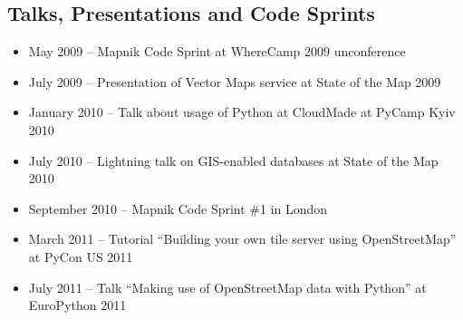 \documentclass[margin]{res}
\begin{document}
\begin{resume}
\section{Talks, Presentations and Code Sprints}

\begin{itemize}
\item May 2009 -- Mapnik Code Sprint at WhereCamp 2009 unconference
\item July 2009 -- Presentation of Vector Maps service at State of the Map 2009
\item January 2010 -- Talk about usage of Python at CloudMade at PyCamp Kyiv 2010
\item July 2010 -- Lightning talk on GIS-enabled databases at State of the Map 2010
\item September 2010 -- Mapnik Code Sprint \#1 in London
\item March 2011 -- Tutorial ``Building your own tile server using OpenStreetMap'' at PyCon US 2011
\item July 2011 -- Talk ``Making use of OpenStreetMap data with Python'' at EuroPython 2011
\end{itemize}

\end{resume}
\end{document}
